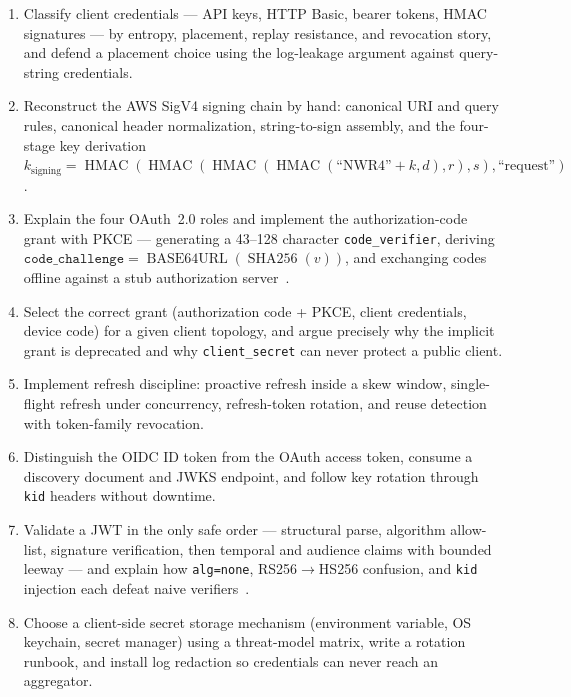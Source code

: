 \begin{enumerate}[label=\textbf{LO-\arabic*.}, leftmargin=2.6cm]
  \item Classify client credentials --- API keys, HTTP Basic, bearer tokens,
        HMAC signatures --- by entropy, placement, replay resistance, and
        revocation story, and defend a placement choice using the
        log-leakage argument against query-string credentials.
  \item Reconstruct the AWS SigV4 signing chain by hand: canonical URI and
        query rules, canonical header normalization, string-to-sign
        assembly, and the four-stage key derivation
        $k_{\text{signing}} = \operatorname{HMAC}(\operatorname{HMAC}(\operatorname{HMAC}(\operatorname{HMAC}(\text{``NWR4''}+k, d), r), s), \text{``request''})$.
  \item Explain the four OAuth~2.0 roles and implement the authorization-code
        grant with PKCE --- generating a 43--128 character
        \texttt{code\_verifier}, deriving
        $\texttt{code\_challenge} = \operatorname{BASE64URL}(\operatorname{SHA256}(v))$,
        and exchanging codes offline against a stub authorization
        server~\cite{rfc6749,rfc7636}.
  \item Select the correct grant (authorization code + PKCE, client
        credentials, device code) for a given client topology, and argue
        precisely why the implicit grant is deprecated and why
        \texttt{client\_secret} can never protect a public client.
  \item Implement refresh discipline: proactive refresh inside a skew window,
        single-flight refresh under concurrency, refresh-token rotation, and
        reuse detection with token-family revocation.
  \item Distinguish the OIDC ID token from the OAuth access token, consume a
        discovery document and JWKS endpoint, and follow key rotation through
        \texttt{kid} headers without downtime.
  \item Validate a JWT in the only safe order --- structural parse,
        algorithm allow-list, signature verification, then temporal and
        audience claims with bounded leeway --- and explain how
        \texttt{alg=none}, RS256$\rightarrow$HS256 confusion, and
        \texttt{kid} injection each defeat naive
        verifiers~\cite{rfc7519,owaspapisecurity}.
  \item Choose a client-side secret storage mechanism (environment variable,
        OS keychain, secret manager) using a threat-model matrix, write a
        rotation runbook, and install log redaction so credentials can never
        reach an aggregator.
\end{enumerate}

